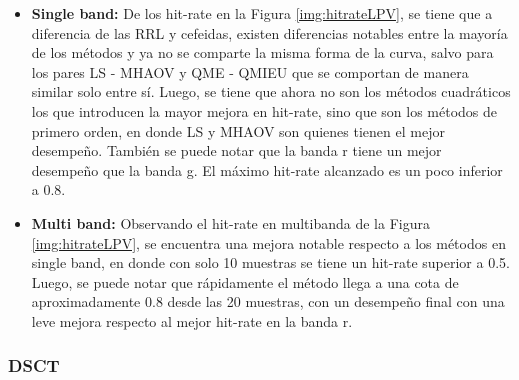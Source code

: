     	\begin{itemize}
    	    \item \textbf{Single band:} De los hit-rate en la Figura \ref{img:hitrateLPV}, se tiene que a diferencia de las RRL y cefeidas, existen diferencias notables entre la mayoría de los métodos y ya no se comparte la misma forma de la curva, salvo para los pares LS - MHAOV y QME - QMIEU que se comportan de manera similar solo entre sí. Luego, se tiene que ahora no son los métodos cuadráticos los que introducen la mayor mejora en hit-rate, sino que son los métodos de primero orden, en donde LS y MHAOV son quienes tienen el mejor desempeño. También se puede notar que la banda r tiene un mejor desempeño que la banda g. El máximo hit-rate alcanzado es un poco inferior a 0.8.
    	    
    	    \item \textbf{Multi band:}  Observando el hit-rate en multibanda de la Figura \ref{img:hitrateLPV}, se encuentra una mejora notable respecto a los métodos en single band, en donde con solo 10 muestras se tiene un hit-rate superior a 0.5. Luego, se puede notar que rápidamente el método llega a una cota de aproximadamente 0.8 desde las 20 muestras, con un desempeño final con una leve mejora respecto al mejor hit-rate en la banda r.
    	\end{itemize}
    	

	    \subsubsection{DSCT}
    	
